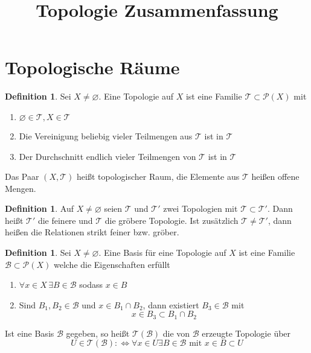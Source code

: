 \documentclass[a4paper, 12pt]{article}
\theoremstyle{plain}
\theoremstyle{definition}
\newtheorem{definition}[theorem]{Definition} %
\theoremstyle{lemma}
\theoremstyle{remark}
\theoremstyle{corollary}
\theoremstyle{example}
\begin{document}
	\begin{titlepage} 
		\title{Topologie Zusammenfassung}
		\clearpage\maketitle
		\thispagestyle{empty}
	\end{titlepage}
	\tableofcontents
	\newpage
	\section{Topologische Räume}
	\begin{definition}
		Sei $X\neq \varnothing$. Eine Topologie auf $X$ ist eine Familie $\mathcal{T} \subset \mathcal{P}(X)$ mit \begin{enumerate}
			\item $\varnothing \in \mathcal{T}, X \in \mathcal{T}$
			\item Die Vereinigung beliebig vieler Teilmengen aus $\mathcal{T}$ ist in $\mathcal{T}$
			\item Der Durchschnitt endlich vieler Teilmengen von $\mathcal{T}$ ist in $\mathcal{T}$
		\end{enumerate}
		Das Paar $(X,\mathcal{T})$ heißt topologischer Raum, die Elemente aus $\mathcal{T}$ heißen offene Mengen.
	\end{definition}
	\begin{definition}
		Auf $X \neq \varnothing$ seien $\mathcal{T}$ und $\mathcal{T}'$ zwei Topologien mit $\mathcal{T}\subset \mathcal{T}'$. Dann heißt $\mathcal{T}'$ die feinere und $\mathcal{T}$ die gröbere Topologie. Ist zusätzlich $\mathcal{T} \neq \mathcal{T}'$, dann heißen die Relationen strikt feiner bzw. gröber.
	\end{definition}
	\begin{definition}
		Sei $X\neq \varnothing$. Eine Basis für eine Topologie auf $X$ ist eine Familie $\mathcal{B}\subset \mathcal{P}(X)$ welche die Eigenschaften erfüllt \begin{enumerate}
			\item $\forall x \in X \, \exists B \in \mathcal{B}$ sodass $x \in B$
			\item Sind $B_1,B_2 \in \mathcal{B}$ und $x \in B_1\cap B_2$, dann existiert $B_3 \in \mathcal{B}$ mit \[x \in B_3 \subset B_1\cap B_2\]
		\end{enumerate}
		Ist eine Basis $\mathcal{B}$ gegeben, so heißt $\mathcal{T}(\mathcal{B})$ die von $\mathcal{B}$ erzeugte Topologie über \[U \in \mathcal{T}(\mathcal{B}) : \Leftrightarrow \forall x \in U \exists B \in \mathcal{B} \text{ mit } x \in B \subset U\]
	\end{definition}
\end{document}
